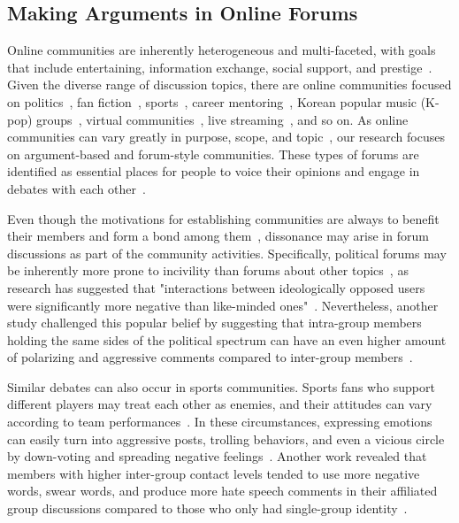 \subsection{Making Arguments in Online Forums}
Online communities are inherently heterogeneous and multi-faceted, with goals that include entertaining, information exchange, social support, and prestige~\cite{kairam_how_2024, moore_redditors_2017}. Given the diverse range of discussion topics, there are online communities focused on politics~\cite{papakyriakopoulos_upvotes_2023, hua_characterizing_2020, lyu_exploring_2023}, fan fiction~\cite{campbell_thousands_2016}, sports~\cite{zhang_this_2018,kim_social_2015, zhang_intergroup_2019, wang_making_2023}, career mentoring~\cite{tomprou_career_2019}, Korean popular music (K-pop) groups~\cite{park_armed_2021}, virtual communities~\cite{fu_i_2023}, live streaming~\cite{lu_you_2018,lu_i_2019,lu_more_2021}, and so on. As online communities can vary greatly in purpose, scope, and topic~\cite{hwang_why_2021}, our research focuses on argument-based and forum-style communities. These types of forums are identified as essential places for people to voice their opinions and engage in debates with each other~\cite{qiu_modeling_2015}.

Even though the motivations for establishing communities are always to benefit their members and form a bond among them~\cite{kairam_how_2024, matthews_goals_2014}, dissonance may arise in forum discussions as part of the community activities. Specifically, political forums may be inherently more prone to incivility than forums about other topics~\cite{efstratiou_non-polar_2022}, as research has suggested that "interactions between ideologically opposed users were significantly more negative than like-minded ones"~\cite{marchal_be_2022}. Nevertheless, another study challenged this popular belief by suggesting that intra-group members holding the same sides of the political spectrum can have an even higher amount of polarizing and aggressive comments compared to inter-group members~\cite{efstratiou_non-polar_2022}.

Similar debates can also occur in sports communities. Sports fans who support different players may treat each other as enemies, and their attitudes can vary according to team performances~\cite{zhang_this_2018}. In these circumstances, expressing emotions can easily turn into aggressive posts, trolling behaviors, and even a vicious circle by down-voting and spreading negative feelings~\cite{wang_making_2023}. Another work revealed that members with higher inter-group contact levels tended to use more negative words, swear words, and produce more hate speech comments in their affiliated group discussions compared to those who only had single-group identity~\cite{zhang_intergroup_2019}.

